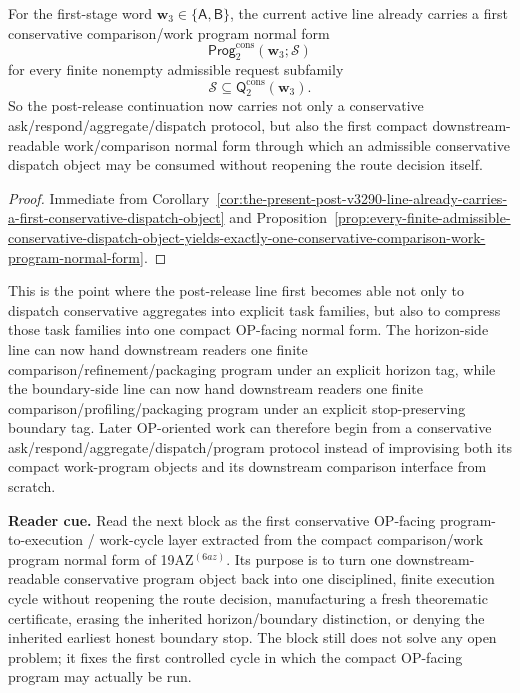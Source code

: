 \begin{corollary}
\label{cor:the-present-post-v3290-line-already-carries-a-first-conservative-comparison-work-program-normal-form}
For the first-stage word \(\mathbf w_3\in\{\mathsf A,\mathsf B\}\), the current active line already carries a first conservative comparison/work program normal form
\[
 \mathsf{Prog}^{\mathrm{cons}}_{2}(\mathbf w_3;\mathcal S)
\]
for every finite nonempty admissible request subfamily
\[
 \mathcal S\subseteq \mathsf{Q}^{\mathrm{cons}}_{2}(\mathbf w_3).
\]
So the post-release continuation now carries not only a conservative ask/respond/aggregate/dispatch protocol, but also the first compact downstream-readable work/comparison normal form through which an admissible conservative dispatch object may be consumed without reopening the route decision itself.
\end{corollary}

\begin{proof}
Immediate from Corollary~\ref{cor:the-present-post-v3290-line-already-carries-a-first-conservative-dispatch-object} and Proposition~\ref{prop:every-finite-admissible-conservative-dispatch-object-yields-exactly-one-conservative-comparison-work-program-normal-form}.
\end{proof}

\begin{remark}
\label{rem:what-the-first-conservative-comparison-work-program-normal-form-now-buys}
This is the point where the post-release line first becomes able not only to dispatch conservative aggregates into explicit task families, but also to compress those task families into one compact OP-facing normal form. The horizon-side line can now hand downstream readers one finite comparison/refinement/packaging program under an explicit horizon tag, while the boundary-side line can now hand downstream readers one finite comparison/profiling/packaging program under an explicit stop-preserving boundary tag. Later OP-oriented work can therefore begin from a conservative ask/respond/aggregate/dispatch/program protocol instead of improvising both its compact work-program objects and its downstream comparison interface from scratch.
\end{remark}


\noindent\textbf{Reader cue.} Read the next block as the first conservative OP-facing program-to-execution / work-cycle layer extracted from the compact comparison/work program normal form of 19AZ$^{(6az)}$. Its purpose is to turn one downstream-readable conservative program object back into one disciplined, finite execution cycle without reopening the route decision, manufacturing a fresh theorematic certificate, erasing the inherited horizon/boundary distinction, or denying the inherited earliest honest boundary stop. The block still does not solve any open problem; it fixes the first controlled cycle in which the compact OP-facing program may actually be run.


